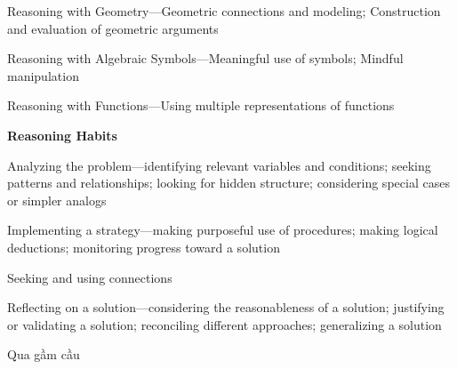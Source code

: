 \documentclass[
  10pt,
  a4paper,
  landscape,
  twoside,
  openany
]{scrbook}
\begin{document}
{Reasoning with Geometry---Geometric connections and modeling; Construction and evaluation of geometric arguments

Reasoning with Algebraic Symbols---Meaningful use of symbols; Mindful
manipulation

Reasoning with Functions---Using multiple representations of functions

\noindent
\textbf{Reasoning Habits}

Analyzing the problem---identifying relevant variables and conditions; seeking patterns and relationships; looking for hidden structure; considering special cases or simpler analogs

Implementing a strategy---making purposeful use of procedures; making logical deductions; monitoring progress toward a solution

Seeking and using connections

Reflecting on a solution---considering the reasonableness of a solution; justifying or validating a solution; reconciling different approaches; generalizing a solution
}
{Qua gầm cầu}
\end{document}
